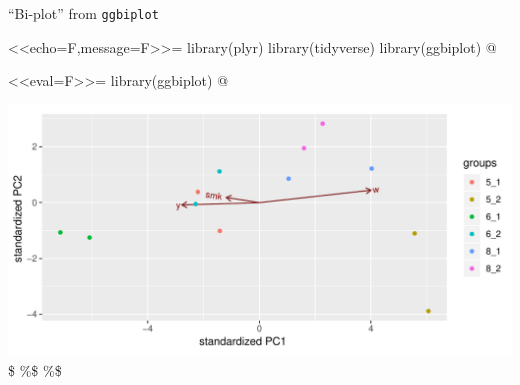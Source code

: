 \documentclass[ignorenonframetext,]{beamer}
\newenvironment{Shaded}{\begin{snugshade}}{\end{snugshade}}
\newcommand{\DataTypeTok}[1]{\textcolor[rgb]{0.13,0.29,0.53}{#1}}
\newcommand{\FloatTok}[1]{\textcolor[rgb]{0.00,0.00,0.81}{#1}}
\newcommand{\KeywordTok}[1]{\textcolor[rgb]{0.13,0.29,0.53}{\textbf{#1}}}
\newcommand{\NormalTok}[1]{#1}
\newcommand{\OperatorTok}[1]{\textcolor[rgb]{0.81,0.36,0.00}{\textbf{#1}}}
\begin{document}
\begin{frame}[fragile]{``Bi-plot'' from \texttt{ggbiplot}}
\protect\hypertarget{bi-plot-from-ggbiplot}{}

\textless{}\textless{}echo=F,message=F\textgreater{}\textgreater{}=
library(plyr) library(tidyverse) library(ggbiplot) @

\textless{}\textless{}eval=F\textgreater{}\textgreater{}=
library(ggbiplot) @

\begin{Shaded}
\end{Shaded}

\includegraphics{figure/unnamed-chunk-294-1.pdf} \$ \%\$ \%\$

\end{frame}
\end{document}
